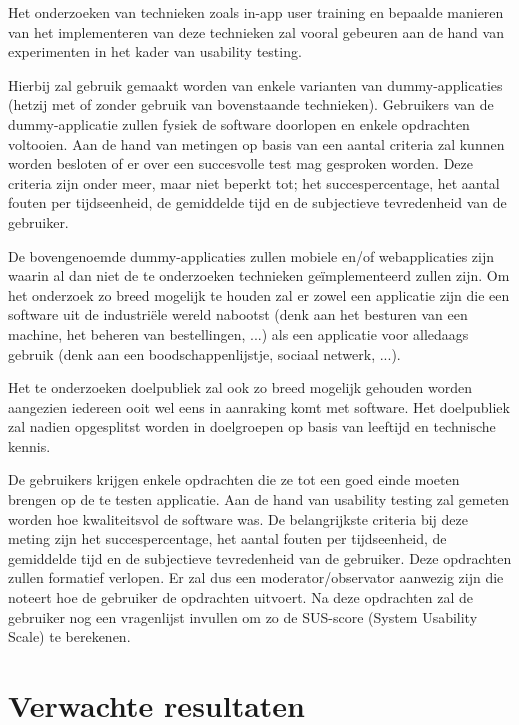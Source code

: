 Het onderzoeken van technieken zoals in-app user training en bepaalde manieren van het implementeren van deze technieken zal vooral gebeuren aan de hand van experimenten in het kader van usability testing.

Hierbij zal gebruik gemaakt worden van enkele varianten van dummy-applicaties (hetzij met of zonder gebruik van bovenstaande technieken). Gebruikers van de dummy-applicatie zullen fysiek de software doorlopen en enkele opdrachten voltooien. Aan de hand van metingen op basis van een aantal criteria zal kunnen worden besloten of er over een succesvolle test mag gesproken worden. Deze criteria zijn onder meer, maar niet beperkt tot; het succespercentage, het aantal fouten per tijdseenheid, de gemiddelde tijd en de subjectieve tevredenheid van de gebruiker.

De bovengenoemde dummy-applicaties zullen mobiele en/of webapplicaties zijn waarin al dan niet de te onderzoeken technieken geïmplementeerd zullen zijn. Om het onderzoek zo breed mogelijk te houden zal er zowel een applicatie zijn die een software uit de industriële wereld nabootst (denk aan het besturen van een machine, het beheren van bestellingen, ...) als een applicatie voor alledaags gebruik (denk aan een boodschappenlijstje, sociaal netwerk, ...).

Het te onderzoeken doelpubliek zal ook zo breed mogelijk gehouden worden aangezien iedereen ooit wel eens in aanraking komt met software. Het doelpubliek zal nadien opgesplitst worden in doelgroepen op basis van leeftijd en technische kennis.

De gebruikers krijgen enkele opdrachten die ze tot een goed einde moeten brengen op de te testen applicatie. Aan de hand van usability testing zal gemeten worden hoe kwaliteitsvol de software was. De belangrijkste criteria bij deze meting zijn het succespercentage, het aantal fouten per tijdseenheid, de gemiddelde tijd en de subjectieve tevredenheid van de gebruiker. Deze opdrachten zullen formatief verlopen. Er zal dus een moderator/observator aanwezig zijn die noteert hoe de gebruiker de opdrachten uitvoert. Na deze opdrachten zal de gebruiker nog een vragenlijst invullen om zo de SUS-score (System Usability Scale) te berekenen.

\section{Verwachte resultaten}
\label{sec:verwachte_resultaten}

